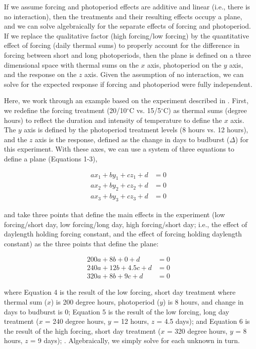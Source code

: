 \documentclass[11pt]{article}
\begin{document}
If we assume forcing and photoperiod effects are additive and linear (i.e., there is no interaction), then the treatments and their resulting effects occupy a plane, and we can solve algebraically for the separate effects of forcing and photoperiod.  If we replace the qualitative factor (high forcing/low forcing) by the quantitative effect of forcing (daily thermal sums) to properly account for the difference in forcing between short and long photoperiods, then the plane is defined on a three dimensional space with thermal sums on the $x$ axis, photoperiod on the $y$ axis, and the response on the $z$ axis. Given the assumption of no interaction, we can solve for the expected response if forcing and photoperiod were fully independent. 

Here, we work through an example based on the experiment described in \cite{Flynn2018}. First, we redefine the forcing treatment (20/10$^{\circ}$C vs. 15/5$^{\circ}$C) as thermal sums (degree hours) to reflect the duration and intensity of temperature to define the $x$ axis. The $y$ axis is defined by the photoperiod treatment levels (8 hours vs. 12 hours), and the $z$ axis is the response, defined as the change in days to budburst ($\Delta$) for this experiment. With these axes, we can use a system of three equations to define a plane (Equations 1-3), 

\begin{align}
ax_1+by_1+cz_1+d & =0\\
ax_2+by_2+cz_2+d & =0\\
ax_3+by_3+cz_3+d & =0
\end{align}

and take three points that define the main effects in the experiment (low forcing/short day, low forcing/long day, high forcing/short day; i.e., the effect of daylength holding forcing constant, and the effect of forcing holding daylength constant) as the three points that define the plane:

\begin{align}
200a + 8b + 0 + d &= 0\\
240a + 12b+4.5c + d &=0\\
320a + 8b + 9c+ d &=0
\end{align}

where Equation 4 is the result of the low forcing, short day treatment where thermal sum ($x$) is 200 degree hours, photoperiod ($y$) is 8 hours, and change in days to budburst is 0; Equation 5 is the result of the low forcing, long day treatment ($x$ = 240 degree hours, $y$ = 12 hours, $z$ = 4.5 days); and Equation 6 is the result of the high forcing, short day treatment ($x$ = 320 degree hours, $y$ = 8 hours, $z$ = 9 days); \citep[see,][Table S5]{Flynn2018}.  Algebraically, we simply solve for each unknown in turn. 
\end{document}
